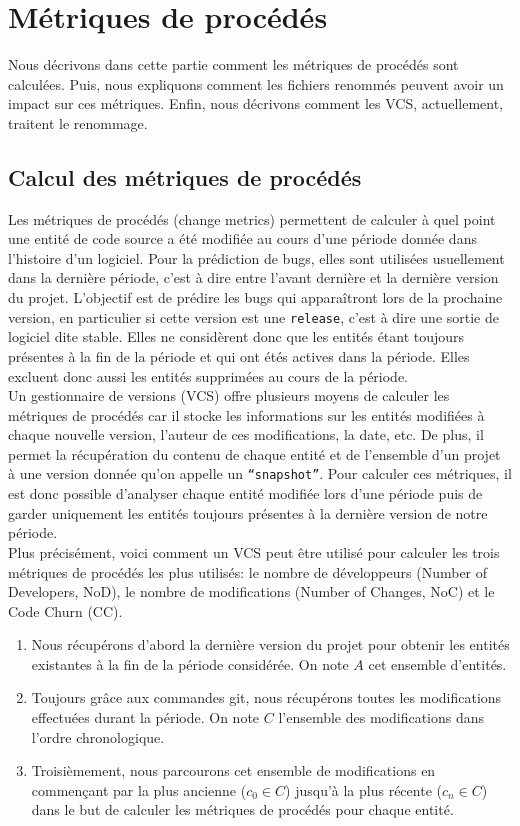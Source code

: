 \section{Métriques de procédés}
\label{sec:metriques}

Nous décrivons dans cette partie comment les métriques de procédés sont calculées. Puis, nous expliquons comment les fichiers renommés peuvent avoir un impact sur ces métriques. Enfin, nous décrivons comment les VCS, actuellement, traitent le renommage.

\subsection{Calcul des métriques de procédés}

Les métriques de procédés (change metrics) permettent de calculer à quel point une entité de code source a été modifiée au cours d'une période donnée dans l'histoire d'un logiciel. Pour la prédiction de bugs, elles sont utilisées usuellement dans la dernière période, c'est à dire entre l'avant dernière et la dernière version du projet. L'objectif est de prédire les bugs qui apparaîtront lors de la prochaine version, en particulier si cette version est une \texttt{release}, c'est à dire une sortie de logiciel dite stable. Elles ne considèrent donc que les entités étant toujours présentes à la fin de la période et qui ont étés actives dans la période. Elles excluent donc aussi les entités supprimées au cours de la période.\\

Un gestionnaire de versions (VCS) offre plusieurs moyens de calculer les métriques de procédés car il stocke les informations sur les entités modifiées à chaque nouvelle version, l'auteur de ces modifications, la date, etc. De plus, il permet la récupération du contenu de chaque entité et de l'ensemble d'un projet à une version donnée qu'on appelle un \texttt{``snapshot''}. Pour calculer ces métriques, il est donc possible d'analyser chaque entité modifiée lors d'une période puis de garder uniquement les entités toujours présentes à la dernière version de notre période.\\

Plus précisément, voici comment un VCS peut être utilisé pour calculer les trois métriques de procédés les plus utilisés: le nombre de développeurs (Number of Developers, NoD), le nombre de modifications  (Number of Changes, NoC) et le Code Churn (CC). 
\begin{enumerate}
\item Nous récupérons d'abord la dernière version du projet pour obtenir les entités existantes à la fin de la période considérée. On note $A$ cet ensemble d'entités.
\item Toujours grâce aux commandes git, nous récupérons toutes les modifications effectuées durant la période. On note $C$ l'ensemble des modifications dans l'ordre chronologique.
\item Troisièmement, nous parcourons cet ensemble de modifications en commençant par la plus ancienne ($c_0 \in C$) jusqu'à la plus récente ($c_n \in C$) dans le but de calculer les métriques de procédés pour chaque entité.
\end{enumerate}

